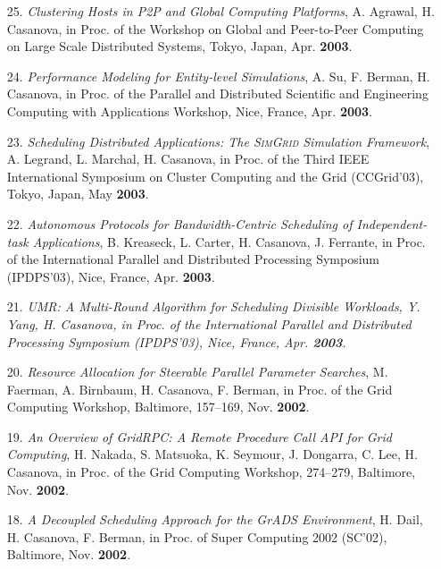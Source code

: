 \begin{enumerate}
\item [25.] 
{\it Clustering Hosts in P2P and Global Computing Platforms}, A. Agrawal,
H. Casanova, in Proc. of the Workshop on Global and Peer-to-Peer
Computing on Large Scale Distributed Systems, Tokyo, Japan, Apr.
{\bf 2003}.


\item [24.]
{\it Performance Modeling for Entity-level Simulations}, A. Su, F. Berman,
H. Casanova, in Proc. of the Parallel and Distributed Scientific
and Engineering Computing with Applications Workshop, Nice, France,
Apr. {\bf 2003}.

\item [23.]
{\it Scheduling Distributed Applications: The \textsc{SimGrid} Simulation
Framework}, A. Legrand, L. Marchal, H. Casanova, in Proc. of the
Third IEEE International Symposium on Cluster Computing and the Grid
(CCGrid'03), Tokyo, Japan, May {\bf 2003}.


\item[22.]
{\it Autonomous Protocols for Bandwidth-Centric Scheduling of
Independent-task Applications}, B. Kreaseck, L. Carter, H. Casanova,
J. Ferrante, in Proc. of the International Parallel and Distributed
Processing Symposium (IPDPS'03), Nice, France, Apr. {\bf 2003}.

\item [21.]
\it{UMR: A Multi-Round Algorithm for Scheduling Divisible Workloads},
Y. Yang, H. Casanova, in Proc. of the International Parallel
and Distributed Processing Symposium (IPDPS'03), Nice, France, Apr.
{\bf 2003}.

\item [20.]
{\it Resource Allocation for Steerable Parallel Parameter Searches},
M. Faerman, A. Birnbaum, H. Casanova, F. Berman, in Proc. of the
Grid Computing Workshop, Baltimore, 157--169, Nov. {\bf 2002}.

\item [19.]
{\it An Overview of GridRPC: A Remote Procedure Call API for Grid
Computing}, H. Nakada, S. Matsuoka, K. Seymour, J. Dongarra, C. Lee,
H. Casanova, in Proc. of the Grid Computing Workshop, 274--279,
Baltimore, Nov. {\bf 2002}.

\item [18.]
{\it A Decoupled Scheduling Approach for the GrADS Environment}, H. Dail,
H. Casanova, F. Berman, in Proc. of  Super Computing 2002 (SC'02),
Baltimore, Nov. {\bf 2002}.


\end{enumerate}
